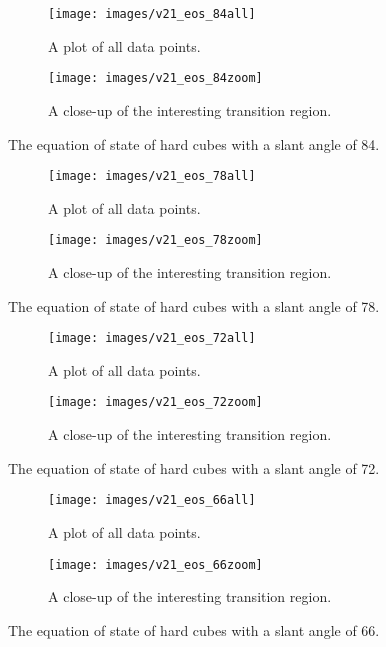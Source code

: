 \documentclass[thesis]{subfiles}
\begin{document}
\begin{figure}[h]
	\begin{subfigure}[t]{0.475\textwidth}
		\texttt{[image: images/v21\_eos\_84all]}
		\caption{A plot of all data points.}
		\label{fig:eos84-a}
	\end{subfigure}\hfill
	\begin{subfigure}[t]{0.475\textwidth}
		\texttt{[image: images/v21\_eos\_84zoom]}
		\caption{A close-up of the interesting transition region.}
		\label{fig:eos84-b}
	\end{subfigure}
	\caption{The equation of state of hard cubes with a slant angle of 84\degr.}
	\label{fig:eos84}
\end{figure}

\begin{figure}[h]
	\begin{subfigure}[t]{0.475\textwidth}
		\texttt{[image: images/v21\_eos\_78all]}
		\caption{A plot of all data points.}
		\label{fig:eos78-a}
	\end{subfigure}\hfill
	\begin{subfigure}[t]{0.475\textwidth}
		\texttt{[image: images/v21\_eos\_78zoom]}
		\caption{A close-up of the interesting transition region.}
		\label{fig:eos78-b}
	\end{subfigure}
	\caption{The equation of state of hard cubes with a slant angle of 78\degr.}
	\label{fig:eos78}
\end{figure}

\begin{figure}[h]
	\begin{subfigure}[t]{0.475\textwidth}
		\texttt{[image: images/v21\_eos\_72all]}
		\caption{A plot of all data points.}
		\label{fig:eos72-a}
	\end{subfigure}\hfill
	\begin{subfigure}[t]{0.475\textwidth}
		\texttt{[image: images/v21\_eos\_72zoom]}
		\caption{A close-up of the interesting transition region.}
		\label{fig:eos72-b}
	\end{subfigure}
	\caption{The equation of state of hard cubes with a slant angle of 72\degr.}
	\label{fig:eos72}
\end{figure}

\begin{figure}[h]
	\begin{subfigure}[t]{0.475\textwidth}
		\texttt{[image: images/v21\_eos\_66all]}
		\caption{A plot of all data points.}
		\label{fig:eos66-a}
	\end{subfigure}\hfill
	\begin{subfigure}[t]{0.475\textwidth}
		\texttt{[image: images/v21\_eos\_66zoom]}
		\caption{A close-up of the interesting transition region.}
		\label{fig:eos66-b}
	\end{subfigure}
	\caption{The equation of state of hard cubes with a slant angle of 66\degr.}
	\label{fig:eos66}
\end{figure}
\end{document}
